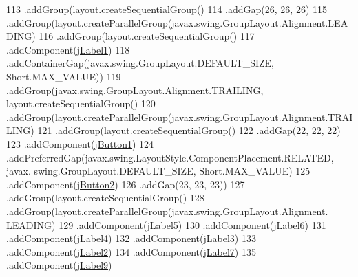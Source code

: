 \begin{DoxyCode}
113             .addGroup(layout.createSequentialGroup()
114                 .addGap(26, 26, 26)
115                 .addGroup(layout.createParallelGroup(javax.swing.GroupLayout.Alignment.LEADING)
116                     .addGroup(layout.createSequentialGroup()
117                         .addComponent(\mbox{\hyperlink{class_interfaz_package_1_1_alta_libro_texto_a9cd5322905fec64c6411d5c05d635d3c}{jLabel1}})
118                         .addContainerGap(javax.swing.GroupLayout.DEFAULT\_SIZE, Short.MAX\_VALUE))
119                     .addGroup(javax.swing.GroupLayout.Alignment.TRAILING, layout.createSequentialGroup()
120                         .addGroup(layout.createParallelGroup(javax.swing.GroupLayout.Alignment.TRAILING)
121                             .addGroup(layout.createSequentialGroup()
122                                 .addGap(22, 22, 22)
123                                 .addComponent(\mbox{\hyperlink{class_interfaz_package_1_1_alta_libro_texto_a22a96730cf3c923a67cc8ef92053d06a}{jButton1}})
124                                 .addPreferredGap(javax.swing.LayoutStyle.ComponentPlacement.RELATED, javax.
      swing.GroupLayout.DEFAULT\_SIZE, Short.MAX\_VALUE)
125                                 .addComponent(\mbox{\hyperlink{class_interfaz_package_1_1_alta_libro_texto_a2a68befdaadc6870fcd31afa3214839b}{jButton2}})
126                                 .addGap(23, 23, 23))
127                             .addGroup(layout.createSequentialGroup()
128                                 .addGroup(layout.createParallelGroup(javax.swing.GroupLayout.Alignment.
      LEADING)
129                                     .addComponent(\mbox{\hyperlink{class_interfaz_package_1_1_alta_libro_texto_a2601c4eaa8dbee3dc1de4d81e78f356c}{jLabel5}})
130                                     .addComponent(\mbox{\hyperlink{class_interfaz_package_1_1_alta_libro_texto_afe4738d8f372b4cbc512e677ee55c159}{jLabel6}})
131                                     .addComponent(\mbox{\hyperlink{class_interfaz_package_1_1_alta_libro_texto_a600b84f835ee7c6e403742afe1817957}{jLabel4}})
132                                     .addComponent(\mbox{\hyperlink{class_interfaz_package_1_1_alta_libro_texto_a28fbe18428baff77e3ba378260ed8de2}{jLabel3}})
133                                     .addComponent(\mbox{\hyperlink{class_interfaz_package_1_1_alta_libro_texto_a627fbe8c20773d8c99f935168bdee2a2}{jLabel2}})
134                                     .addComponent(\mbox{\hyperlink{class_interfaz_package_1_1_alta_libro_texto_a2ad918dee833595289fcf66c1d1933ef}{jLabel7}})
135                                     .addComponent(\mbox{\hyperlink{class_interfaz_package_1_1_alta_libro_texto_af230caad4def2d93c0ebd623faf2dd01}{jLabel9}})

\end{DoxyCode}
